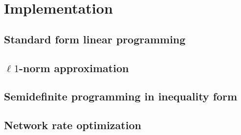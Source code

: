 \section{Implementation}

\subsection{Standard form linear programming}

\subsection{$\ell 1$-norm approximation}

\subsection{Semidefinite programming in inequality form}

\subsection{Network rate optimization}

